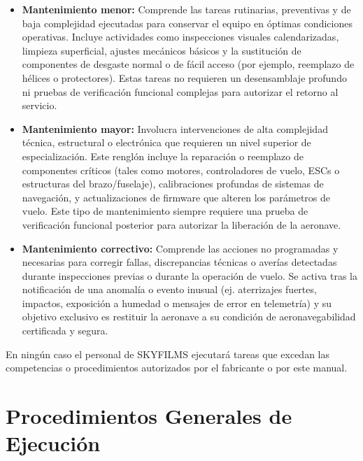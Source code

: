 \begin{itemize}
    \item \textbf{Mantenimiento menor:} Comprende las tareas rutinarias, preventivas y de baja complejidad ejecutadas para conservar el equipo en óptimas condiciones operativas. Incluye actividades como inspecciones visuales calendarizadas, limpieza superficial, ajustes mecánicos básicos y la sustitución de componentes de desgaste normal o de fácil acceso (por ejemplo, reemplazo de hélices o protectores). Estas tareas no requieren un desensamblaje profundo ni pruebas de verificación funcional complejas para autorizar el retorno al servicio.

    \item \textbf{Mantenimiento mayor:} Involucra intervenciones de alta complejidad técnica, estructural o electrónica que requieren un nivel superior de especialización. Este renglón incluye la reparación o reemplazo de componentes críticos (tales como motores, controladores de vuelo, ESCs o estructuras del brazo/fuselaje), calibraciones profundas de sistemas de navegación, y actualizaciones de firmware que alteren los parámetros de vuelo. Este tipo de mantenimiento siempre requiere una prueba de verificación funcional posterior para autorizar la liberación de la aeronave.

    \item \textbf{Mantenimiento correctivo:} Comprende las acciones no programadas y necesarias para corregir fallas, discrepancias técnicas o averías detectadas durante inspecciones previas o durante la operación de vuelo. Se activa tras la notificación de una anomalía o evento inusual (ej. aterrizajes fuertes, impactos, exposición a humedad o mensajes de error en telemetría) y su objetivo exclusivo es restituir la aeronave a su condición de aeronavegabilidad certificada y segura.

\end{itemize}

En ningún caso el personal de SKYFILMS ejecutará tareas que excedan las competencias o procedimientos autorizados por el fabricante o por este manual.

\section{Procedimientos Generales de Ejecución}

